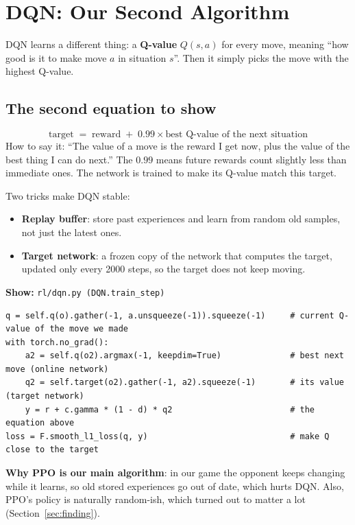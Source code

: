 \documentclass[11pt,a4paper]{article}
\newcommand{\code}[1]{\texttt{#1}}
\newcommand{\showfile}[1]{\par\noindent\textbf{Show:} \code{#1}\par}
\begin{document}
\section{DQN: Our Second Algorithm}
DQN learns a different thing: a \textbf{Q-value} $Q(s,a)$ for every move, meaning ``how good
is it to make move $a$ in situation $s$''. Then it simply picks the move with the highest Q-value.

\subsection*{The second equation to show}
\[
\text{target} \;=\; \text{reward} \;+\; 0.99 \times \text{best Q-value of the next situation}
\]
How to say it: ``The value of a move is the reward I get now, plus the value of the best thing I
can do next.'' The $0.99$ means future rewards count slightly less than immediate ones. The network
is trained to make its Q-value match this target.

Two tricks make DQN stable:
\begin{itemize}
  \item \textbf{Replay buffer}: store past experiences and learn from random old samples, not
        just the latest ones.
  \item \textbf{Target network}: a frozen copy of the network that computes the target, updated
        only every 2000 steps, so the target does not keep moving.
\end{itemize}

\showfile{rl/dqn.py  (DQN.train\_step)}
\begin{lstlisting}
q = self.q(o).gather(-1, a.unsqueeze(-1)).squeeze(-1)     # current Q-value of the move we made
with torch.no_grad():
    a2 = self.q(o2).argmax(-1, keepdim=True)              # best next move (online network)
    q2 = self.target(o2).gather(-1, a2).squeeze(-1)       # its value (target network)
    y = r + c.gamma * (1 - d) * q2                        # the equation above
loss = F.smooth_l1_loss(q, y)                             # make Q close to the target
\end{lstlisting}
\textbf{Why PPO is our main algorithm}: in our game the opponent keeps changing while it learns, so
old stored experiences go out of date, which hurts DQN. Also, PPO's policy is naturally
random-ish, which turned out to matter a lot (Section~\ref{sec:finding}).

\end{document}
